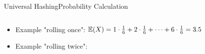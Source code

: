 \begin{frame}{Universal Hashing}{Probability Calculation}
\begin{columns}
\begin{column}{0.5\linewidth}
\begin{table}[!h]
   \end{table}
   \end{column}
 \end{columns}
 \begin{itemize}
 \vspace*{-1.0em}
 \item<4-> Example "rolling once": 
  {\color{MainA}$\mathbb{E}(X) = 1 \cdot \frac{1}{6} + 2 \cdot \frac{1}{6}
    + \dots + 6 \cdot \frac{1}{6} = 3.5$}
 \item<6-> Example "rolling twice": 
   \end{itemize}
\end{frame}





